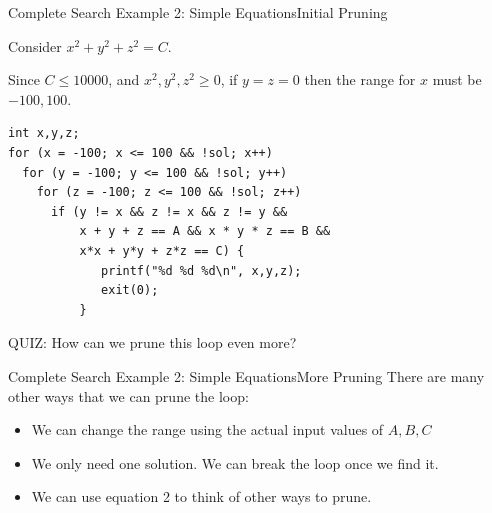 
\begin{frame}[fragile]{Complete Search Example 2: Simple Equations}{Initial Pruning}
  \begin{block}{}
    Consider $x^2 + y^2 + z^2 = C$.\medskip

    Since $C \leq 10000$, and $x^2,y^2,z^2 \geq 0$, if $y =
    z = 0$ then the range for $x$ must be $-100, 100$.
  \end{block}

{\smaller
\begin{verbatim}
int x,y,z;
for (x = -100; x <= 100 && !sol; x++)
  for (y = -100; y <= 100 && !sol; y++)
    for (z = -100; z <= 100 && !sol; z++)
      if (y != x && z != x && z != y &&
          x + y + z == A && x * y * z == B &&
          x*x + y*y + z*z == C) {
             printf("%d %d %d\n", x,y,z);
             exit(0);
          }
\end{verbatim}}

\begin{block}{}
  QUIZ: How can we prune this loop even more?
\end{block}
\end{frame}

\begin{frame}{Complete Search Example 2: Simple Equations}{More Pruning}
  There are many other ways that we can prune the loop:

  \medskip

  \begin{itemize}
  \item We can change the range using the actual input values of $A,B,C$
  \item We only need one solution. We can break the loop once we find it.
  \item We can use equation 2 to think of other ways to prune.
  \end{itemize}

  \vfill

\end{frame}

